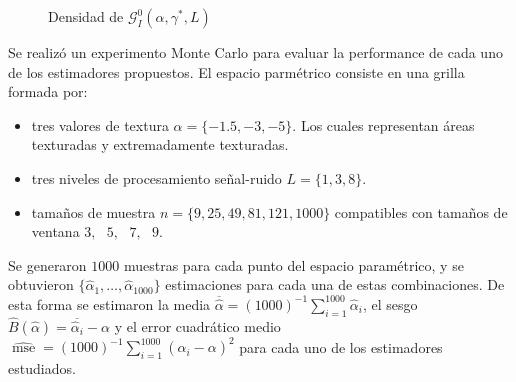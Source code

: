 \begin{figure}[h!]
	\caption{\label{densidades}\small Densidad de $\mathcal{G}_I^0(\alpha,\gamma^*,L)$}
\end{figure}


Se realizó un experimento Monte Carlo para evaluar la performance de cada uno de los estimadores propuestos. El espacio parmétrico consiste en una grilla formada por:
\begin{itemize}
	\item tres valores de textura $\alpha=\{-1.5,-3,-5\}$. Los cuales representan áreas texturadas y extremadamente texturadas.
	\item tres niveles de procesamiento señal-ruido $L=\{1,3,8\}$.
	\item tamaños de muestra $n=\{9,25,49,81,121,1000\}$ compatibles con tamaños de ventana $3,\text{ }5,\text{ }7,\text{ }9$.
\end{itemize}

Se generaron $1000$ muestras para cada punto del espacio paramétrico, y se obtuvieron $\{\widehat{\alpha}_1, \dots, \widehat{\alpha}_{1000}\}$ estimaciones para cada una de estas combinaciones. De esta forma se estimaron la media $\overline{\widehat{\alpha}}=(1000)^{-1}{\sum_{i=1}^{1000}{\widehat{\alpha}_i}}$, el sesgo  $\widehat{B}(\widehat\alpha) = \overline{\widehat\alpha_i}- \alpha$ y el error cuadrático medio $\widehat{\operatorname{mse}}=({1000})^{-1}{\sum_{i=1}^{1000}{(\widehat{\alpha}_i-\alpha)^2}}$ para cada uno de los estimadores estudiados.

